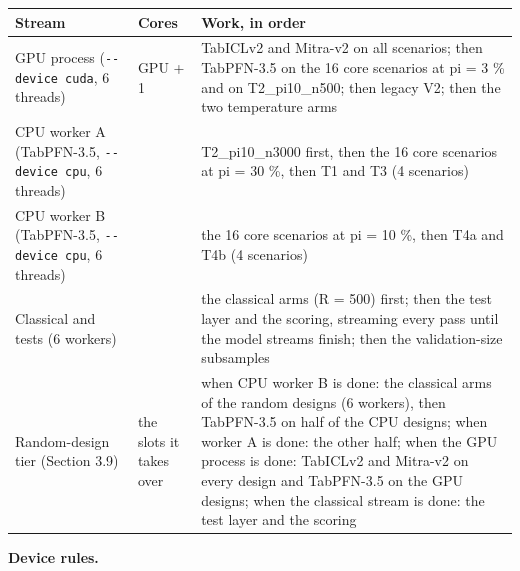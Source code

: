 \documentclass[
  10pt,
]{article}
\newcounter{none} %
\begin{document}
{\def\LTcaptype{none} %
\begin{longtable}[]{@{}
  >{\raggedright\arraybackslash}p{}
  >{\raggedright\arraybackslash}p{}
  >{\raggedright\arraybackslash}p{}@{}}
\toprule\noalign{}
\begin{minipage}[b]{\linewidth}\raggedright
Stream
\end{minipage} & \begin{minipage}[b]{\linewidth}\raggedright
Cores
\end{minipage} & \begin{minipage}[b]{\linewidth}\raggedright
Work, in order
\end{minipage} \\
\midrule\noalign{}
\endhead
\bottomrule\noalign{}
\endlastfoot
GPU process (\texttt{-\/-device\ cuda}, 6 threads) & GPU + 1
& TabICLv2 and Mitra-v2 on all scenarios; then TabPFN-3.5 on
the 16 core scenarios at pi = 3 \% and on T2\_pi10\_n500;
then legacy V2; then the two temperature arms \\
CPU worker A (TabPFN-3.5, \texttt{-\/-device\ cpu}, 6
threads) & 6 & T2\_pi10\_n3000 first, then the 16 core
scenarios at pi = 30 \%, then T1 and T3 (4 scenarios) \\
CPU worker B (TabPFN-3.5, \texttt{-\/-device\ cpu}, 6
threads) & 6 & the 16 core scenarios at pi = 10 \%, then T4a
and T4b (4 scenarios) \\
Classical and tests (6 workers) & 6 & the classical arms (R
= 500) first; then the test layer and the scoring, streaming
every pass until the model streams finish; then the
validation-size subsamples \\
Random-design tier (Section 3.9) & the slots it takes over &
when CPU worker B is done: the classical arms of the random
designs (6 workers), then TabPFN-3.5 on half of the CPU
designs; when worker A is done: the other half; when the GPU
process is done: TabICLv2 and Mitra-v2 on every design and
TabPFN-3.5 on the GPU designs; when the classical stream is
done: the test layer and the scoring \\
\end{longtable}
}

\textbf{Device rules.}
\end{document}
